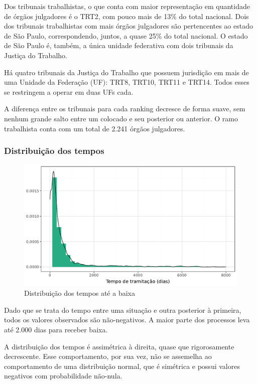 Dos tribunais trabalhistas, o que conta com maior representação em quantidade de órgãos julgadores é o TRT2, com pouco mais de 13\% do total nacional. Dois dos tribunais trabalhistas com mais órgãos julgadores são pertencentes ao estado de São Paulo, correspondendo, juntos, a quase 25\% do total nacional. O estado de São Paulo é, também, a única unidade federativa com dois tribunais da Justiça do Trabalho.

Há quatro tribunais da Justiça do Trabalho que possuem jurisdição em mais de uma Unidade da Federação (UF): TRT8, TRT10, TRT11 e TRT14. Todos esses se restringem a operar em duas UFs cada.

A diferença entre os tribunais para cada ranking decresce de forma suave, sem nenhum grande salto entre um colocado e seu posterior ou anterior. O ramo trabalhista conta com um total de 2.241 órgãos julgadores.


\subsubsection{Distribuição dos tempos}
\begin{figure}[H]
    \centering
    \caption{Distribuição dos tempos até a baixa}
    \includegraphics[scale=.85]{imagens/dist_tempo.pdf}
\end{figure}

Dado que se trata do tempo entre uma situação e outra posterior à primeira, todos os valores observados são não-negativos. A maior parte dos processos leva até 2.000 dias para receber baixa. 

A distribuição dos tempos é assimétrica à direita, quase que rigorosamente decrescente. Esse comportamento, por sua vez, não se assemelha ao comportamento de uma distribuição normal, que é simétrica e possui valores negativos com probabilidade não-nula.

